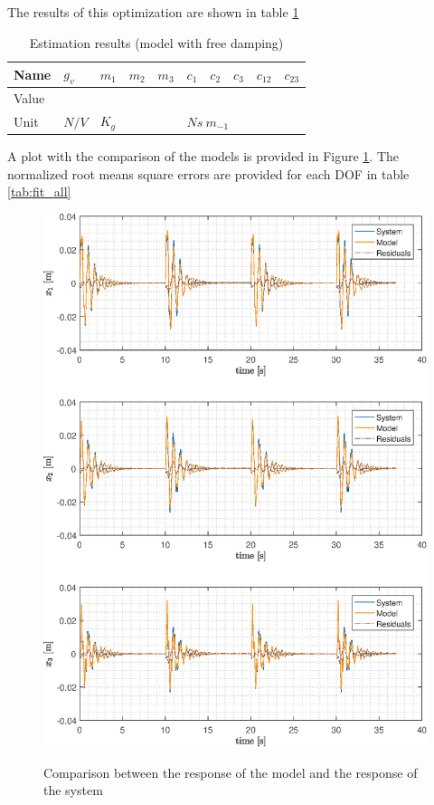 \documentclass[twosided,a4paper]{article}           %
\begin{document}
The results of this optimization are shown in table \ref{tab:est_full_results}
\begin{table}[H]
	\centering
	\label{tab:est_full_results}
	\begin{tabular}{|l|l|l|l|l|l|l|l|l|l|}
		\hline
		Name & $g_v$ &  $m_1$ & $m_2$ & $m_3$  &  $c_1$ & $c_2$ & $c_3$  & $c_{12}$ & $c_{23}$ \\
		\hline
		Value &  &  &  &  &  &  &  &  &  \\ 
		\hline
		Unit & $N/V$ &  \multicolumn{3}{l|}{$K_g$}  &  \multicolumn{5}{l|}{$Ns \ m_{-1}$} \\
		\hline
\end{tabular}
\caption{Estimation results (model with free damping)}
\end{table}
A plot with the comparison of the models is provided in Figure \ref{fig:compare_f}. The normalized root means square errors are provided for each DOF in table \ref{tab:fit_all}
\begin{figure}[H]
	\centering
		\caption{Comparison between the response of the model and the response of the system}
	\includegraphics[width=\linewidth]{img/compare_f}
	\label{fig:compare_f}
\end{figure}
\end{document}
